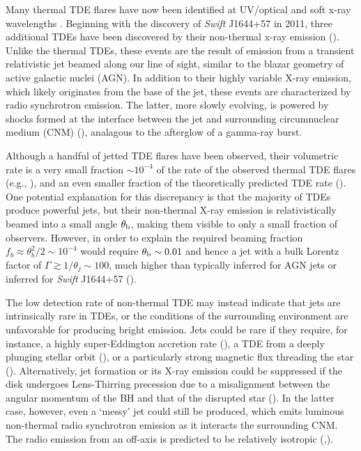 \documentclass[usenatbib,fleqn]{mnras}
\begin{document}
Many thermal TDE flares have now been identified at UV/optical
\citep{van-Velzen+2011, Gezari+2012, Chornock+2014, Arcavi+2014} and
soft x-ray wavelengths \citep{Esquej+2007}.  Beginning with the
discovery of {\it Swift} J1644+57 in 2011, three additional TDEs have
been discovered by their non-thermal x-ray emission
(\citealt{Bloom+2011, Levan+2011, Burrows+2011, Zauderer+2011,
  Cenko+2012, Pasham+2015, Brown+2015}).  Unlike the thermal TDEs,
these events are the result of emission from a transient relativistic
jet beamed along our line of sight, similar to the blazar geometry of
active galactic nuclei (AGN).  In addition to their highly variable
X-ray emission, which likely originates from the base of the jet,
these events are characterized by radio synchrotron emission.  The
latter, more slowly evolving, is powered by shocks formed at the
interface between the jet and surrounding circumnuclear medium (CNM)
(\citealt{Giannios&Metzger2011,Metzger+2012}), analagous to the
afterglow of a gamma-ray burst.

Although a handful of jetted TDE flares have been observed, their
volumetric rate is a very small fraction $\sim 10^{-4}$ of the rate of
the observed thermal TDE flares (e.g., \citealt{Burrows+2011}), and an
even smaller fraction of the theoretically predicted TDE rate
(\citealt{Stone&Metzger2016}).  One potential explanation for this
discrepancy is that the majority of TDEs produce powerful jets, but
their non-thermal X-ray emission is relativistically beamed into a
small angle $\theta_{\rm b}$, making them visible to only a small
fraction of observers.  However, in order to explain the required
beaming fraction $f_b \approx \theta_{b}^{2}/2 \sim 10^{-4}$ would
require $\theta_{\rm b} \sim 0.01$ and hence a jet with a bulk Lorentz
factor of $\Gamma \gtrsim 1/\theta_j \sim 100$, much higher than
typically inferred for AGN jets or inferred for {\it Swift} J1644+57
(\citealt{Metzger+2012}).

The low detection rate of non-thermal TDE may instead indicate that
jets are intrinsically rare in TDEs, or the conditions of the
surrounding environment are unfavorable for producing bright emission.
Jets could be rare if they require, for instance, a highly
super-Eddington accretion rate (\citealt{De-Colle+2012}), a TDE from a
deeply plunging stellar orbit (\citealt{Metzger&Stone2015}), or a
particularly strong magnetic flux threading the star
(\citealt{Tchekhovskoy+2014,Kelley+2014}).  Alternatively, jet formation
or its X-ray emission could be suppressed if the disk undergoes
Lens-Thirring precession due to a misalignment between the angular
momentum of the BH and that of the disrupted star
(\citealt{Stone&Loeb2012}).  In the latter case, however, even a `messy'
jet could still be produced, which emits luminous non-thermal radio
synchrotron emission as it interacts the surrounding CNM.  The radio
emission from an off-axis is predicted to be relatively isotropic
(\citealt{Giannios&Metzger2011},\citealt{Mimica+2015}).
\end{document}
